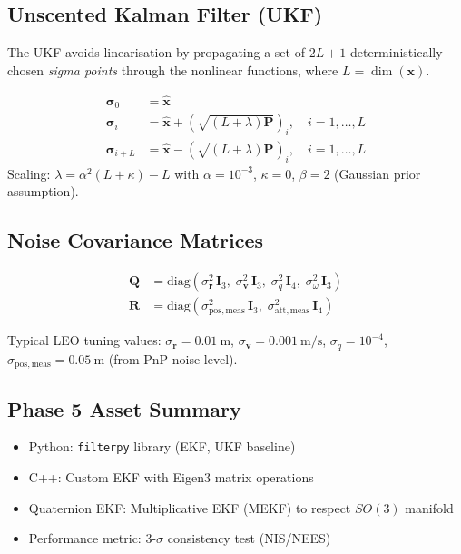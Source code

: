 \documentclass[12pt, a4paper]{article}
\newcommand{\vr}{\mathbf{r}}
\newcommand{\vv}{\mathbf{v}}
\newcommand{\vx}{\mathbf{x}}
\newcommand{\mP}{\mathbf{P}}
\newcommand{\mQ}{\mathbf{Q}}
\newcommand{\mR}{\mathbf{R}}
\begin{document}
\subsection{Unscented Kalman Filter (UKF)}

The UKF avoids linearisation by propagating a set of $2L+1$ deterministically
chosen \emph{sigma points} through the nonlinear functions, where $L = \dim(\vx)$.

\begin{formulabox}[title=Merwe-Scaled Sigma Point Selection]
\begin{align}
\bm{\sigma}_0     &= \hat{\vx} \\
\bm{\sigma}_i     &= \hat{\vx} + \left(\sqrt{(L+\lambda)\mP}\right)_i, \quad i = 1,\ldots,L \\
\bm{\sigma}_{i+L} &= \hat{\vx} - \left(\sqrt{(L+\lambda)\mP}\right)_i, \quad i = 1,\ldots,L
\end{align}
Scaling: $\lambda = \alpha^2(L + \kappa) - L$ with $\alpha = 10^{-3}$,
$\kappa = 0$, $\beta = 2$ (Gaussian prior assumption).
\end{formulabox}

\subsection{Noise Covariance Matrices}

\begin{align}
\mQ &= \mathrm{diag}\!\left(\sigma_{\vr}^2\,\mathbf{I}_3,\;
       \sigma_{\vv}^2\,\mathbf{I}_3,\;
       \sigma_{q}^2\,\mathbf{I}_4,\;
       \sigma_{\omega}^2\,\mathbf{I}_3\right) \\[4pt]
\mR &= \mathrm{diag}\!\left(\sigma_{\mathrm{pos,meas}}^2\,\mathbf{I}_3,\;
       \sigma_{\mathrm{att,meas}}^2\,\mathbf{I}_4\right)
\end{align}

Typical LEO tuning values:
$\sigma_{\vr} = 0.01\ \mathrm{m}$,
$\sigma_{\vv} = 0.001\ \mathrm{m/s}$,
$\sigma_q = 10^{-4}$,
$\sigma_{\mathrm{pos,meas}} = 0.05\ \mathrm{m}$ (from PnP noise level).

\subsection{Phase 5 Asset Summary}
\begin{assetbox}[title=Phase 5 Assets]
\begin{itemize}[leftmargin=1.5em, itemsep=2pt]
    \item Python: \texttt{filterpy} library (EKF, UKF baseline)
    \item C++: Custom EKF with Eigen3 matrix operations
    \item Quaternion EKF: Multiplicative EKF (MEKF) to respect $SO(3)$ manifold
    \item Performance metric: 3-$\sigma$ consistency test (NIS/NEES)
\end{itemize}
\end{assetbox}
\end{document}

